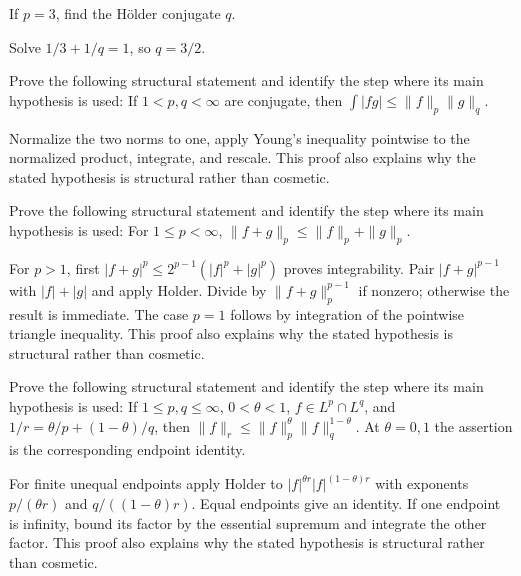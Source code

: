 \begin{problem}\label{prob:iii07-problem-08}
If \(p=3\), find the Hölder conjugate \(q\).
\end{problem}
\begin{solution}
Solve \(1/3+1/q=1\), so \(q=3/2\).
\end{solution}

\begin{problem}\label{prob:iii07-problem-09}
Prove the following structural statement and identify the step where its main hypothesis is used: If $1<p,q<\infty$ are conjugate, then $\int|fg|\le\|f\|_p\|g\|_q$.
\end{problem}
\begin{solution}
Normalize the two norms to one, apply Young's inequality pointwise to the normalized product, integrate, and rescale. This proof also explains why the stated hypothesis is structural rather than cosmetic.
\end{solution}

\begin{problem}\label{prob:iii07-problem-10}
Prove the following structural statement and identify the step where its main hypothesis is used: For $1\le p<\infty$, $\|f+g\|_p\le\|f\|_p+\|g\|_p$.
\end{problem}
\begin{solution}
For $p>1$, first $|f+g|^p\le2^{p-1}(|f|^p+|g|^p)$ proves integrability. Pair $|f+g|^{p-1}$ with $|f|+|g|$ and apply Holder. Divide by $\|f+g\|_p^{p-1}$ if nonzero; otherwise the result is immediate. The case $p=1$ follows by integration of the pointwise triangle inequality. This proof also explains why the stated hypothesis is structural rather than cosmetic.
\end{solution}

\begin{problem}\label{prob:iii07-problem-11}
Prove the following structural statement and identify the step where its main hypothesis is used: If $1\le p,q\le\infty$, $0<\theta<1$, $f\in L^p\cap L^q$, and $1/r=\theta/p+(1-\theta)/q$, then $\|f\|_r\le\|f\|_p^\theta\|f\|_q^{1-\theta}$. At $\theta=0,1$ the assertion is the corresponding endpoint identity.
\end{problem}
\begin{solution}
For finite unequal endpoints apply Holder to $|f|^{\theta r}|f|^{(1-\theta)r}$ with exponents $p/(\theta r)$ and $q/((1-\theta)r)$. Equal endpoints give an identity. If one endpoint is infinity, bound its factor by the essential supremum and integrate the other factor. This proof also explains why the stated hypothesis is structural rather than cosmetic.
\end{solution}

